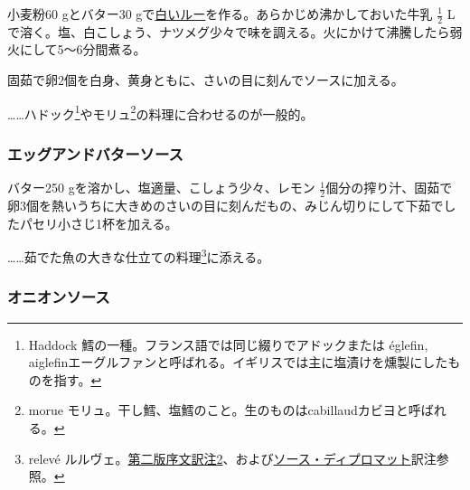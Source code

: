 \begin{recette}
小麦粉60 gとバター30
gで\protect\hyperlink{roux-blanc}{白いルー}を作る。あらかじめ沸かしておいた牛乳
\(\frac{1}{2}\)
Lで溶く。塩、白こしょう、ナツメグ少々で味を調える。火にかけて沸騰したら弱火にして5〜6分間煮る。

固茹で卵2個を白身、黄身ともに、さいの目に刻んでソースに加える。

\ldots{}\ldots{}ハドック\footnote{Haddock
  鱈の一種。フランス語では同じ綴りでアドックまたは églefin,
  aiglefinエーグルファンと呼ばれる。イギリスでは主に塩漬けを燻製にしたものを指す。}やモリュ\footnote{morue
  モリュ。干し鱈、塩鱈のこと。生のものはcabillaudカビヨと呼ばれる。}の料理に合わせるのが一般的。

\hypertarget{eggs-and-butter-sauce}{%
\subsubsection{エッグアンドバターソース}\label{eggs-and-butter-sauce}}



バター250 gを溶かし、塩適量、こしょう少々、レモン
\(\frac{1}{2}\)個分の搾り汁、固茹で卵3個を熱いうちに大きめのさいの目に刻んだもの、みじん切りにして下茹でしたパセリ小さじ1杯を加える。

\ldots{}\ldots{}茹でた魚の大きな仕立ての料理\footnote{relevé
  ルルヴェ。\protect\hyperlink{releve}{第二版序文訳注2}、および\protect\hyperlink{sauce-diplomate}{ソース・ディプロマット}訳注参照。}に添える。

\hypertarget{onions-sauce}{%
\subsubsection{オニオンソース}\label{onions-sauce}}


\end{recette}
